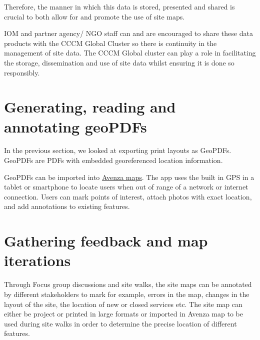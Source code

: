 \documentclass[
  a4paper,
  onecolumn,
  oneside]{book}
\begin{document}
Therefore, the manner in which this data is stored, presented and shared
is crucial to both allow for and promote the use of site maps.

\begin{tcolorbox}[enhanced jigsaw, opacitybacktitle=0.6, colbacktitle=quarto-callout-note-color!10!white, breakable, coltitle=black, title=\textcolor{quarto-callout-note-color}{\faInfo}\hspace{0.5em}{Note}, toprule=.15mm, bottomrule=.15mm, colback=white, left=2mm, toptitle=1mm, bottomtitle=1mm, arc=.35mm, colframe=quarto-callout-note-color-frame, titlerule=0mm, opacityback=0, rightrule=.15mm, leftrule=.75mm]

IOM and partner agency/ NGO staff can and are encouraged to share these
data products with the CCCM Global Cluster so there is continuity in the
management of site data. The CCCM Global cluster can play a role in
facilitating the storage, dissemination and use of site data whilst
ensuring it is done so responsibly.

\end{tcolorbox}

\hypertarget{generating-reading-and-annotating-geopdfs}{%
\section{Generating, reading and annotating
geoPDFs}\label{generating-reading-and-annotating-geopdfs}}

In the previous section, we looked at exporting print layouts as
GeoPDFs. GeoPDFs are PDFs with embedded georeferenced location
information.

GeoPDFs can be imported into
\href{https://www.avenzamaps.com/mobile-maps?campaignid=10221828697\&adgroupid=102940455500\&adid=453328850375\&gclid=Cj0KCQiAg_KbBhDLARIsANx7wAxTp38Kmz11Ou-eCXzYSF_EkQpvBq3PvAo3sxuIS88hZMkaglVMWSAaAtEFEALw_wcB}{Avenza
maps}. The app uses the built in GPS in a tablet or smartphone to locate
users when out of range of a network or internet connection. Users can
mark points of interest, attach photos with exact location, and add
annotations to existing features.

\hypertarget{gathering-feedback-and-map-iterations}{%
\section{Gathering feedback and map
iterations}\label{gathering-feedback-and-map-iterations}}

Through Focus group discussions and site walks, the site maps can be
annotated by different stakeholders to mark for example, errors in the
map, changes in the layout of the site, the location of new or closed
services etc. The site map can either be project or printed in large
formats or imported in Avenza map to be used during site walks in order
to determine the precise location of different features.
\end{document}
